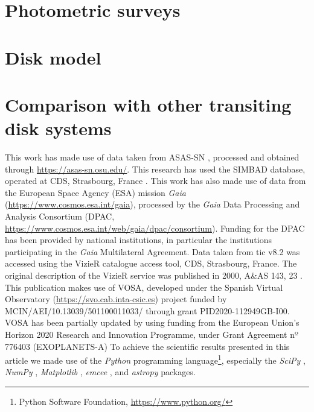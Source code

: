 \documentclass[]{aa} %
\begin{document}
\section{Photometric surveys}\label{sec:surveys}

\section{Disk model}\label{sec:model}

\section{Comparison with other transiting disk systems}\label{sec:comparison}


\begin{acknowledgements}
      This work has made use of data taken from ASAS-SN \citep{shappee_man_2014, kochanek_all-sky_2017}, processed and obtained through \url{https://asas-sn.osu.edu/}.
This research has used the SIMBAD database, operated at CDS, Strasbourg, France \citep{wenger2000}.
%
This work has also made use of data from the European Space Agency (ESA) mission {\it Gaia} (\url{https://www.cosmos.esa.int/gaia}), processed by the {\it Gaia} Data Processing and Analysis Consortium (DPAC, \url{https://www.cosmos.esa.int/web/gaia/dpac/consortium}).
%
Funding for the DPAC has been provided by national institutions, in particular the institutions participating in the {\it Gaia} Multilateral Agreement. Data taken from tic v8.2 was accessed using the VizieR catalogue access tool, CDS, Strasbourg, France.%
%
The original description of the VizieR service was published in 2000, A\&AS 143, 23 \citep{2000A&AS..143...23O}.
%
This publication makes use of VOSA, developed under the Spanish Virtual Observatory (\url{https://svo.cab.inta-csic.es}) project funded by MCIN/AEI/10.13039/501100011033/ through grant PID2020-112949GB-I00.
%
VOSA has been partially updated by using funding from the European Union's Horizon 2020 Research and Innovation Programme, under Grant Agreement nº 776403 (EXOPLANETS-A)
%
To achieve the scientific results presented in this article we made use of the \emph{Python} programming language\footnote{Python Software Foundation, \url{https://www.python.org/}}, especially the \emph{SciPy} \citep{virtanen2020}, \emph{NumPy} \citep{numpy}, \emph{Matplotlib} \citep{Matplotlib}, \emph{emcee} \citep{foreman-mackey2013}, and \emph{astropy} \citep{astropy_1,astropy_2} packages.
\end{acknowledgements}




\end{document}
